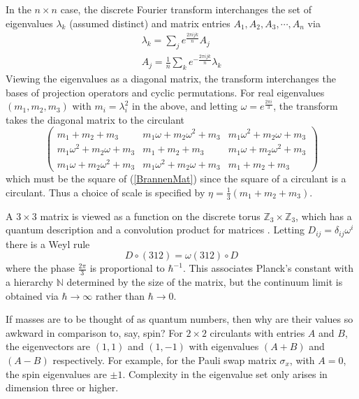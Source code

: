 \documentclass[aps,prl,onecolumn,showpacs,address,11pt]{revtex4}
\begin{document}
In the $n \times n$ case, the discrete Fourier transform
\cite{AdrovBook}\cite{NielsenChuang} interchanges the set of
eigenvalues $\lambda_{k}$ (assumed distinct) and matrix entries
$A_1 , A_2, A_3 , \cdots , A_n$ via
\begin{eqnarray} \lambda_k = \sum_{j} e^{\frac{2 \pi i jk}{n}}
A_{j} \\ \nonumber A_j = \frac{1}{n} \sum_{k} e^{- \frac{2 \pi i
jk}{n}} \lambda_{k} \end{eqnarray} Viewing the eigenvalues as a
diagonal matrix, the transform interchanges the bases of
projection operators and cyclic permutations. For real eigenvalues
$(m_1 , m_2 , m_3)$ with $m_i = \lambda_{i}^{2}$ in the above, and
letting $\omega = e^{\frac{2 \pi i}{3}}$, the transform takes the
diagonal matrix to the circulant {\small
\[ \left( \begin{array}{ccc} m_1 + m_2 + m_3
& m_1 \omega + m_2 \omega^{2} + m_3 & m_1 \omega^{2} + m_2 \omega
+ m_3 \\ m_1 \omega^{2} + m_2 \omega
+ m_3 & m_1 + m_2 + m_3 & m_1 \omega + m_2 \omega^{2} + m_3 \\
m_1 \omega + m_2 \omega^{2} + m_3 & m_1 \omega^{2} + m_2 \omega +
m_3 & m_1 + m_2 + m_3
\end{array} \right) \] } which must be the square of
(\ref{BrannenMat}) since the square of a circulant is a circulant.
Thus a choice of scale is specified by $\eta = \frac{1}{3} (m_1 +
m_2 + m_3)$.

A $3 \times 3$ matrix is viewed as a function on the discrete
torus $\mathbb{Z}_{3} \times \mathbb{Z}_{3}$, which has a quantum
description and a convolution product for matrices
\cite{AdrovBook}. Letting $D_{ij} = \delta_{ij} \omega^{i}$ there is a Weyl rule \[ D \circ (312) = \omega (312)
\circ D \] where the phase $\frac{2 \pi}{3}$ is proportional to
$\hbar^{-1}$. This associates Planck's constant with a hierarchy
$\mathbb{N}$ determined by the size of the matrix, but the
continuum limit is obtained via $\hbar \rightarrow \infty$ rather
than $\hbar \rightarrow 0$.

If masses are to be thought of as quantum numbers, then why are
their values so awkward in comparison to, say, spin? For $2 \times
2$ circulants with entries $A$ and $B$, the eigenvectors are
$(1,1)$ and $(1,-1)$ with eigenvalues $(A + B)$ and $(A - B)$
respectively. For example, for the Pauli swap matrix $\sigma_{x}$,
with $A = 0$, the spin eigenvalues are $\pm 1$. Complexity in the
eigenvalue set only arises in dimension three or higher.
\end{document}

